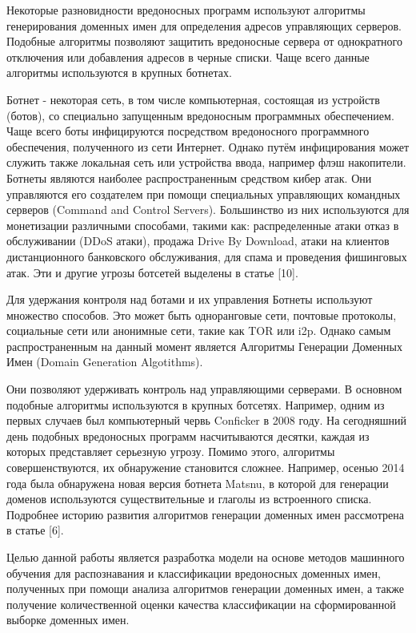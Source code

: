 
Некоторые разновидности вредоносных программ используют алгоритмы генерирования доменных имен для определения адресов управляющих серверов. Подобные алгоритмы позволяют защитить вредоносные сервера от однократного отключения или добавления адресов в черные списки. Чаще всего данные алгоритмы используются в крупных ботнетах.

Ботнет - некоторая сеть, в том числе компьютерная, состоящая из устройств (ботов), со специально запущенным вредоносным программных обеспечением. Чаще всего боты инфицируются посредством вредоносного программного обеспечения, полученного из сети Интернет. Однако путём инфицирования может служить также локальная сеть или устройства ввода, например флэш накопители. Ботнеты являются наиболее распространенным средством кибер атак. Они управляются его создателем при помощи специальных управляющих командных серверов (Command and Control Servers). Большинство из них используются для монетизации различными способами, такими как: распределенные атаки отказ в обслуживании (DDoS атаки), продажа Drive By Download, атаки на клиентов дистанционного банковского обслуживания, для спама и проведения фишинговых атак. Эти и другие угрозы ботсетей выделены в статье [10].

Для удержания контроля над ботами и их управления Ботнеты используют множество способов. Это может быть одноранговые сети, почтовые протоколы, социальные сети или анонимные сети, такие как TOR или i2p.
Однако самым распространенным на данный момент является Алгоритмы Генерации Доменных Имен (Domain Generation Algotithms).

Они позволяют удерживать контроль над управляющими серверами. В основном подобные алгоритмы используются в крупных ботсетях. Например, одним из первых случаев был компьютерный червь Conficker в 2008 году. На сегодняшний день подобных вредоносных программ насчитываются десятки, каждая из которых представляет серьезную угрозу. Помимо этого, алгоритмы совершенствуются, их обнаружение становится сложнее. Например, осенью 2014 года была обнаружена новая версия ботнета Matsnu, в которой для генерации доменов используются существительные и глаголы из встроенного списка. Подробнее историю развития алгоритмов генерации доменных имен рассмотрена в статье [6].

Целью данной работы является разработка модели на основе методов машинного обучения для распознавания и классификации вредоносных доменных имен, полученных при помощи анализа алгоритмов генерации доменных имен, а также получение количественной оценки качества классификации на сформированной выборке доменных имен.

